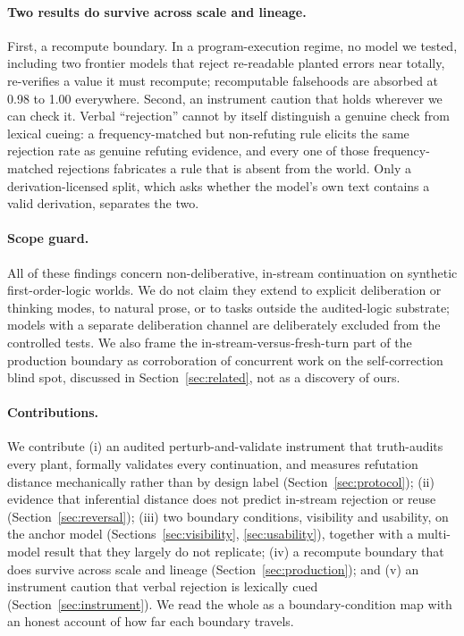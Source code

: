 \paragraph{Two results do survive across scale and lineage.} First, a
recompute boundary. In a program-execution regime, no model we tested,
including two frontier models that reject re-readable planted errors near
totally, re-verifies a value it must recompute; recomputable falsehoods are
absorbed at 0.98 to 1.00 everywhere.
Second, an instrument caution that holds wherever we can check it. Verbal
``rejection'' cannot by itself distinguish a genuine check from lexical
cueing: a frequency-matched but non-refuting rule elicits the same
rejection rate as genuine refuting evidence, and every one of those
frequency-matched rejections fabricates a rule that is absent from the
world.
Only a derivation-licensed split, which asks whether the model's own text
contains a valid derivation, separates the two.

\paragraph{Scope guard.} All of these findings concern non-deliberative,
in-stream continuation on synthetic first-order-logic worlds. We do not
claim they extend to explicit deliberation or thinking modes, to natural
prose, or to tasks outside the audited-logic substrate; models with a
separate deliberation channel are deliberately excluded from the
controlled tests.
We also frame the in-stream-versus-fresh-turn part of the production
boundary as corroboration of concurrent work on the self-correction blind
spot, discussed in Section~\ref{sec:related}, not as a discovery of ours.

\paragraph{Contributions.} We contribute (i) an audited perturb-and-validate
instrument that truth-audits every plant, formally validates every
continuation, and measures refutation distance mechanically rather than by
design label (Section~\ref{sec:protocol}); (ii) evidence that inferential
distance does not predict in-stream rejection or reuse
(Section~\ref{sec:reversal}); (iii) two
boundary conditions, visibility and usability, on the anchor model
(Sections~\ref{sec:visibility}, \ref{sec:usability}), together with a
multi-model result that they largely do not replicate; (iv)
a recompute boundary that does survive across scale and lineage
(Section~\ref{sec:production}); and (v) an instrument caution that verbal
rejection is lexically cued (Section~\ref{sec:instrument}). We read the
whole as a boundary-condition map with an honest account of how far each
boundary travels.
